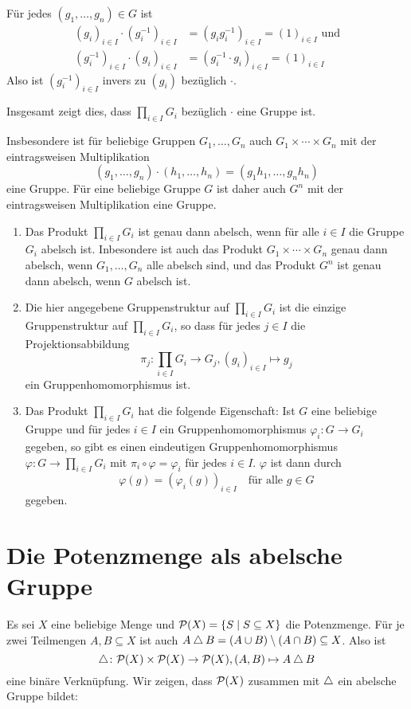 Für jedes $(g_1, \dotsc, g_n) \in G$ ist
\begin{align*}
 (g_i)_{i \in I} \cdot (g_i^{-1})_{i \in I}
 &= (g_i g_i^{-1})_{i \in I}
 = (1)_{i \in I} \text{ und} \\
 (g_i^{-1})_{i \in I} \cdot (g_i)_{i \in I}
 &= (g_i^{-1} \cdot g_i)_{i \in I}
 = (1)_{i \in I}
\end{align*}
Also ist $(g_i^{-1})_{i \in I}$ invers zu $(g_i)$ bezüglich $\cdot$.

Insgesamt zeigt dies, dass $\prod_{i \in I} G_i$ bezüglich $\cdot$ eine Gruppe ist.

Insbesondere ist für beliebige Gruppen $G_1, \dotsc, G_n$ auch $G_1 \times \dotsb \times G_n$ mit der eintragsweisen Multiplikation
\[
 (g_1, \dotsc, g_n) \cdot (h_1, \dotsc, h_n) = (g_1 h_1, \dotsc, g_n h_n)
\]
eine Gruppe. Für eine beliebige Gruppe $G$ ist daher auch $G^n$ mit der eintragsweisen Multiplikation eine Gruppe.


\begin{bem}
 \begin{enumerate}[leftmargin=*]
  \item
   Das Produkt $\prod_{i \in I} G_i$ ist genau dann abelsch, wenn für alle $i \in I$ die Gruppe $G_i$ abelsch ist. Inbesondere ist auch das Produkt $G_1 \times \dotsb \times G_n$ genau dann abelsch, wenn $G_1, \dotsc, G_n$ alle abelsch sind, und das Produkt $G^n$ ist genau dann abelsch, wenn $G$ abelsch ist.
  \item
   Die hier angegebene Gruppenstruktur auf $\prod_{i \in I} G_i$ ist die einzige Gruppenstruktur auf $\prod_{i \in I} G_i$, so dass für jedes $j \in I$ die Projektionsabbildung
   \[
    \pi_j \colon \prod_{i \in I} G_i \to G_j, (g_i)_{i \in I} \mapsto g_j
   \]
   ein Gruppenhomomorphismus ist.
  \item
   Das Produkt $\prod_{i \in I} G_i$ hat die folgende Eigenschaft: Ist $G$ eine beliebige Gruppe und für jedes $i \in I$ ein Gruppenhomomorphismus $\varphi_i \colon G \to G_i$ gegeben, so gibt es einen eindeutigen Gruppenhomomorphismus $\varphi \colon G \to \prod_{i \in I} G_i$ mit $\pi_i \circ \varphi = \varphi_i$ für jedes $i \in I$. $\varphi$ ist dann durch
   \[
    \varphi(g) = (\varphi_i(g))_{i \in I}
    \quad
    \text{für alle $g \in G$}
   \]
   gegeben.
 \end{enumerate}
\end{bem}





\section{Die Potenzmenge als abelsche Gruppe}
Es sei $X$ eine beliebige Menge und $\mathcal{P}(X) = \{S \mid S \subseteq X\}$ die Potenzmenge. Für je zwei Teilmengen $A, B \subseteq X$ ist auch $A \bigtriangleup B = (A \cup B) \setminus (A \cap B) \subseteq X$. Also ist
\[
 \bigtriangleup \colon \mathcal{P}(X) \times \mathcal{P}(X) \to \mathcal{P}(X),
 (A,B) \mapsto A \bigtriangleup B
\]
eine binäre Verknüpfung. Wir zeigen, dass $\mathcal{P}(X)$ zusammen mit $\bigtriangleup$ ein abelsche Gruppe bildet:

